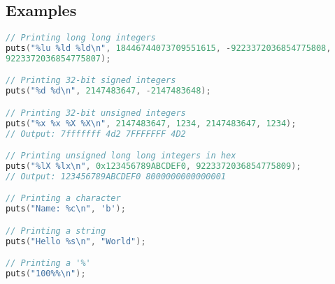 \documentclass{article}
\begin{document}
\subsection*{Examples}
\begin{lstlisting}[language=C,showstringspaces=false]
// Printing long long integers
puts("%lu %ld %ld\n", 18446744073709551615, -9223372036854775808, 
9223372036854775807);

// Printing 32-bit signed integers
puts("%d %d\n", 2147483647, -2147483648);

// Printing 32-bit unsigned integers
puts("%x %x %X %X\n", 2147483647, 1234, 2147483647, 1234);
// Output: 7fffffff 4d2 7FFFFFFF 4D2

// Printing unsigned long long integers in hex
puts("%lX %lx\n", 0x123456789ABCDEF0, 9223372036854775809);
// Output: 123456789ABCDEF0 8000000000000001

// Printing a character
puts("Name: %c\n", 'b');

// Printing a string
puts("Hello %s\n", "World");

// Printing a '%'
puts("100%%\n");
\end{lstlisting}
\end{document}
